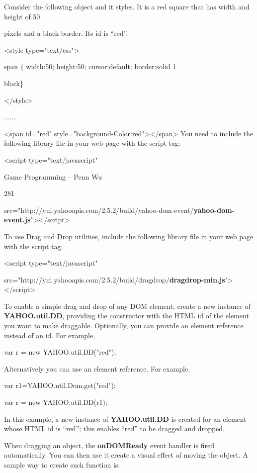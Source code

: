 \documentclass[
]{article}
\begin{document}
Consider the following object and it styles. It is a red square that has
width and height of 50

pixels and a black border. Its id is ``red''.

\textless style type="text/css"\textgreater{}

span \{ width:50; height:50; cursor:default; border:solid 1

black\}

\textless/style\textgreater{}

......

\textless span id="red"
style="background-Color:red"\textgreater\textless/span\textgreater{} You
need to include the following library file in your web page with the
script tag:

\textless script type="text/javascript"

Game Programming -- Penn Wu

281

\protect\hypertarget{index_split_015.htmlux5cux23p282}{}{}src="http://yui.yahooapis.com/2.5.2/build/yahoo-dom-event/\textbf{yahoo-dom-event.js}"\textgreater\textless/script\textgreater{}

To use Drag and Drop utilities, include the following library file in
your web page with the script tag:

\textless script type="text/javascript"

src="http://yui.yahooapis.com/2.5.2/build/dragdrop/\textbf{dragdrop-min.js}"\textgreater\textless/script\textgreater{}

To enable a simple drag and drop of any DOM element, create a new
instance of \textbf{YAHOO.util.DD}, providing the constructor with the
HTML id of the element you want to make draggable. Optionally, you can
provide an element reference instead of an id. For example,

var r = new YAHOO.util.DD("red");

Alternatively you can use an element reference. For example,

var r1=YAHOO.util.Dom.get("red");

var r = new YAHOO.util.DD(r1);

In this example, a new instance of \textbf{YAHOO.util.DD} is created for
an element whose HTML id is ``red''; this enables ``red'' to be dragged
and dropped.

When dragging an object, the \textbf{onDOMReady} event handler is fired
automatically. You can then use it create a visual effect of moving the
object. A sample way to create such function is:
\end{document}
